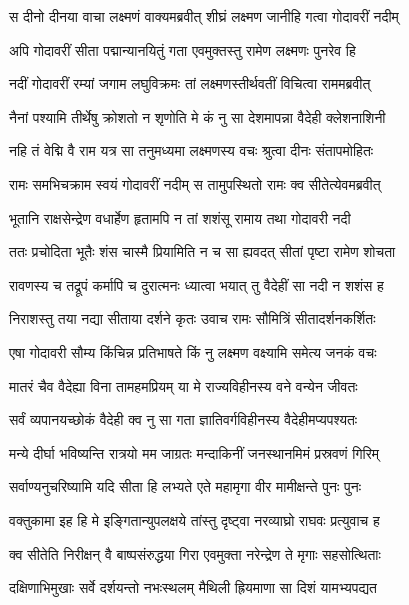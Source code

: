 
\twolineshloka
{स दीनो दीनया वाचा लक्ष्मणं वाक्यमब्रवीत्}
{शीघ्रं लक्ष्मण जानीहि गत्वा गोदावरीं नदीम्} %

\twolineshloka
{अपि गोदावरीं सीता पद्मान्यानयितुं गता}
{एवमुक्तस्तु रामेण लक्ष्मणः पुनरेव हि} %

\twolineshloka
{नदीं गोदावरीं रम्यां जगाम लघुविक्रमः}
{तां लक्ष्मणस्तीर्थवतीं विचित्वा राममब्रवीत्} %

\twolineshloka
{नैनां पश्यामि तीर्थेषु क्रोशतो न शृणोति मे}
{कं नु सा देशमापन्ना वैदेही क्लेशनाशिनी} %

\twolineshloka
{नहि तं वेद्मि वै राम यत्र सा तनुमध्यमा}
{लक्ष्मणस्य वचः श्रुत्वा दीनः संतापमोहितः} %

\twolineshloka
{रामः समभिचक्राम स्वयं गोदावरीं नदीम्}
{स तामुपस्थितो रामः क्व सीतेत्येवमब्रवीत्} %

\twolineshloka
{भूतानि राक्षसेन्द्रेण वधार्हेण हृतामपि}
{न तां शशंसू रामाय तथा गोदावरी नदी} %

\twolineshloka
{ततः प्रचोदिता भूतैः शंस चास्मै प्रियामिति}
{न च सा ह्यवदत् सीतां पृष्टा रामेण शोचता} %

\twolineshloka
{रावणस्य च तद्रूपं कर्मापि च दुरात्मनः}
{ध्यात्वा भयात् तु वैदेहीं सा नदी न शशंस ह} %

\twolineshloka
{निराशस्तु तया नद्या सीताया दर्शने कृतः}
{उवाच रामः सौमित्रिं सीतादर्शनकर्शितः} %

\twolineshloka
{एषा गोदावरी सौम्य किंचिन्न प्रतिभाषते}
{किं नु लक्ष्मण वक्ष्यामि समेत्य जनकं वचः} %

\twolineshloka
{मातरं चैव वैदेह्या विना तामहमप्रियम्}
{या मे राज्यविहीनस्य वने वन्येन जीवतः} %

\twolineshloka
{सर्वं व्यपानयच्छोकं वैदेही क्व नु सा गता}
{ज्ञातिवर्गविहीनस्य वैदेहीमप्यपश्यतः} %

\twolineshloka
{मन्ये दीर्घा भविष्यन्ति रात्रयो मम जाग्रतः}
{मन्दाकिनीं जनस्थानमिमं प्रस्रवणं गिरिम्} %

\twolineshloka
{सर्वाण्यनुचरिष्यामि यदि सीता हि लभ्यते}
{एते महामृगा वीर मामीक्षन्ते पुनः पुनः} %

\twolineshloka
{वक्तुकामा इह हि मे इङ्गितान्युपलक्षये}
{तांस्तु दृष्ट्वा नरव्याघ्रो राघवः प्रत्युवाच ह} %

\twolineshloka
{क्व सीतेति निरीक्षन् वै बाष्पसंरुद्धया गिरा}
{एवमुक्ता नरेन्द्रेण ते मृगाः सहसोत्थिताः} %

\twolineshloka
{दक्षिणाभिमुखाः सर्वे दर्शयन्तो नभःस्थलम्}
{मैथिली ह्रियमाणा सा दिशं यामभ्यपद्यत} %

